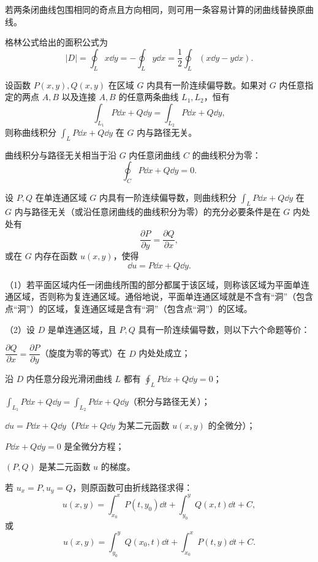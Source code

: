 若两条闭曲线包围相同的奇点且方向相同，则可用一条容易计算的闭曲线替换原曲线。

格林公式给出的面积公式为
\[
|D|=\oint_Lx\dd y=-\oint_Ly\dd x
=\frac12\oint_L(x\dd y-y\dd x).
\]



设函数 $P(x,y),Q(x,y)$ 在区域 $G$ 内具有一阶连续偏导数。如果对 $G$ 内任意指定的两点 $A,B$ 以及连接 $A,B$ 的任意两条曲线 $L_1,L_2$，恒有
\[
\int_{L_1}P\dd x+Q\dd y
=\int_{L_2}P\dd x+Q\dd y,
\]
则称曲线积分 $\int_LP\dd x+Q\dd y$ 在 $G$ 内与路径无关。

曲线积分与路径无关相当于沿 $G$ 内任意闭曲线 $C$ 的曲线积分为零：
\[
\oint_CP\dd x+Q\dd y=0.
\]


设 $P,Q$ 在单连通区域 $G$ 内具有一阶连续偏导数，则曲线积分
$\int_LP\dd x+Q\dd y$ 在 $G$ 内与路径无关（或沿任意闭曲线的曲线积分为零）的充分必要条件是在 $G$ 内处处有
\[
\frac{\partial P}{\partial y}=\frac{\partial Q}{\partial x},
\]
或在 $G$ 内存在函数 $u(x,y)$，使得
\[
\dd u=P\dd x+Q\dd y.
\]

\begin{notebox}
（1）若平面区域内任一闭曲线所围的部分都属于该区域，则称该区域为平面单连通区域，否则称为复连通区域。通俗地说，平面单连通区域就是不含有“洞”（包含点“洞”）的区域，复连通区域是含有“洞”（包含点“洞”）的区域。

（2）设 $D$ 是单连通区域，且 $P,Q$ 具有一阶连续偏导数，则以下六个命题等价：

 $\dfrac{\partial Q}{\partial x}=\dfrac{\partial P}{\partial y}$（旋度为零的等式）在 $D$ 内处处成立；

 沿 $D$ 内任意分段光滑闭曲线 $L$ 都有 $\displaystyle\oint_LP\dd x+Q\dd y=0$；

 $\displaystyle\int_{L_1}P\dd x+Q\dd y=\int_{L_2}P\dd x+Q\dd y$（积分与路径无关）；

 $\dd u=P\dd x+Q\dd y$（$P\dd x+Q\dd y$ 为某二元函数 $u(x,y)$ 的全微分）；

 $P\dd x+Q\dd y=0$ 是全微分方程；

 $(P,Q)$ 是某二元函数 $u$ 的梯度。
\end{notebox}


若 $u_x=P,u_y=Q$，则原函数可由折线路径求得：
\[
u(x,y)=\int_{x_0}^{x}P(t,y_0)\dd t
+\int_{y_0}^{y}Q(x,t)\dd t+C,
\]
或
\[
u(x,y)=\int_{y_0}^{y}Q(x_0,t)\dd t
+\int_{x_0}^{x}P(t,y)\dd t+C.
\]

